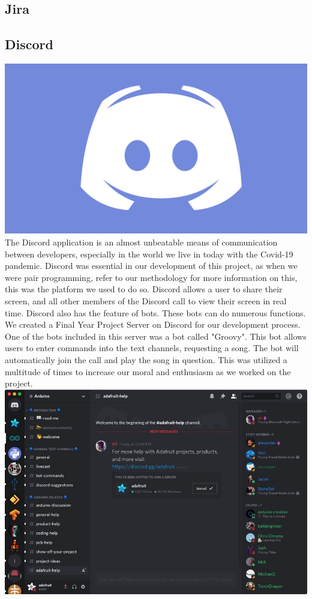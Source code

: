 \subsection{Jira}

\subsection{Discord}
\includegraphics[scale=0.15]{img/discord-logo.jpg} \newline
The Discord application is an almost unbeatable means of communication between developers, especially in the world we live in today with the Covid-19 pandemic. Discord was essential in our development of this project, as when we were pair programming, refer to our methodology for more information on this, this was the platform we used to do so. Discord allows a user to share their screen, and all other members of the Discord call to view their screen in real time. Discord also has the feature of bots. These bots can do numerous functions. We created a Final Year Project Server on Discord for our development process. One of the bots included in this server was a bot called "Groovy". This bot allows users to enter commands into the text channels, requesting a song. The bot will automatically join the call and play the song in question. This was utilized a multitude of times to increase our moral and enthusiasm as we worked on the project. \newline
\includegraphics[scale=0.5]{img/server.jpg}
\newline

